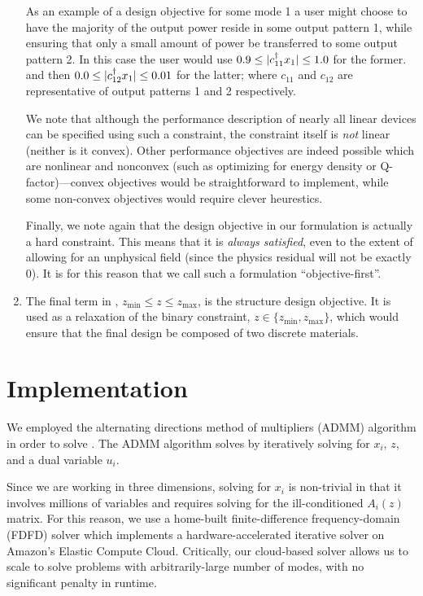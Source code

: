\begin{enumerate}
    As an example of a design objective for some mode 1 
        a user might choose to have the majority of the output power
        reside in some output pattern 1,
        while ensuring that only a small amount of power 
        be transferred to some output pattern 2.
    In this case the user would use 
        $0.9 \le |c_{11}^\dagger x_1| \le 1.0$ for the former.
        and then $0.0 \le |c_{12}^\dagger x_1| \le 0.01$ for the latter;
        where $c_{11}$ and $c_{12}$ are representative of 
        output patterns 1 and 2 respectively.

    We note that although the performance description of nearly all
        linear devices can be specified using such a constraint,
        the constraint itself is \emph{not} linear (neither is it convex).
    Other performance objectives are indeed possible which are nonlinear 
        and nonconvex (such as optimizing for energy density or Q-factor)---convex 
        objectives would be straightforward to implement,
        while some non-convex objectives would require clever heurestics.
        
    Finally, we note again that the design objective in our formulation
        is actually a hard constraint.
    This means that it is \emph{always satisfied}, 
        even to the extent of allowing for an unphysical field 
        (since the physics residual will not be exactly 0).
    It is for this reason that we call such a formulation ``objective-first''.

\item 
    The final term in , $z_\text{min} \le z \le z_\text{max}$,
        is the structure design objective.
    It is used as a relaxation of the binary constraint,
        $z \in \{z_\text{min}, z_\text{max}\}$,
        which would ensure that the final design be composed 
        of two discrete materials.
\end{enumerate}

\section{Implementation}
We employed the alternating directions method of multipliers (ADMM) algorithm 
    \cite{Boyd11}
    in order to solve .
The ADMM algorithm solves  by iteratively solving for 
    $x_i$, $z$, and a dual variable $u_i$.

Since we are working in three dimensions, solving  for $x_i$ 
    is non-trivial in that it involves millions of variables and
    requires solving for the ill-conditioned $A_i(z)$ matrix.
For this reason, we use a home-built
    finite-difference frequency-domain (FDFD) solver which 
    implements a hardware-accelerated iterative solver\cite{Shin12}
    on Amazon's Elastic Compute Cloud.
Critically, our cloud-based solver allows us to scale to solve problems
    with arbitrarily-large number of modes,
    with no significant penalty in runtime.

